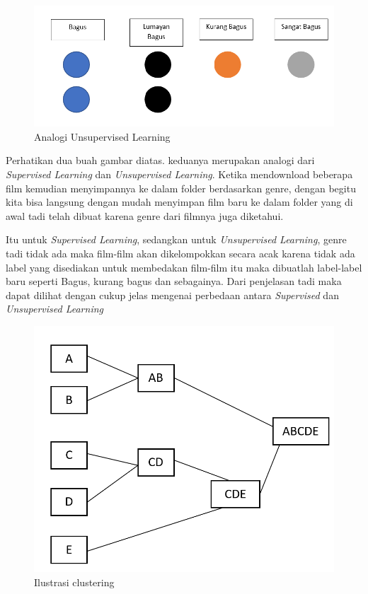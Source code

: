\documentclass{report}
\begin{document}
 \begin{figure}[hbtp]
 \caption{Analogi Unsupervised Learning}
 \centering
 \includegraphics[scale=0.4]{../figures/unsupervised learning.png}
 \end{figure}
 
 \hangindent=0.5cm Perhatikan dua buah gambar diatas. keduanya merupakan analogi dari \emph{Supervised Learning} dan \emph{Unsupervised Learning}. Ketika mendownload beberapa film kemudian menyimpannya ke dalam folder berdasarkan genre, dengan begitu kita bisa langsung dengan mudah menyimpan film baru ke dalam folder yang di awal tadi telah dibuat karena genre dari filmnya juga diketahui. 
 
 \vspace{0.3cm}
 
\hangindent=0.5cm Itu untuk \emph{Supervised Learning}, sedangkan untuk \emph{Unsupervised Learning}, genre tadi tidak ada maka film-film akan dikelompokkan secara acak karena tidak ada label yang disediakan untuk membedakan film-film itu maka dibuatlah label-label baru seperti Bagus, kurang bagus dan sebagainya. Dari penjelasan tadi maka dapat dilihat dengan cukup jelas mengenai perbedaan antara \emph{Supervised} dan \emph{Unsupervised Learning}

\vspace{0.4cm}
\pagebreak{}
\begin{figure}[t!]
\centering
\caption{Ilustrasi clustering}
\centering
\includegraphics[scale=0.3]{../figures/Clustering.png}
\end{figure}
\end{document}
